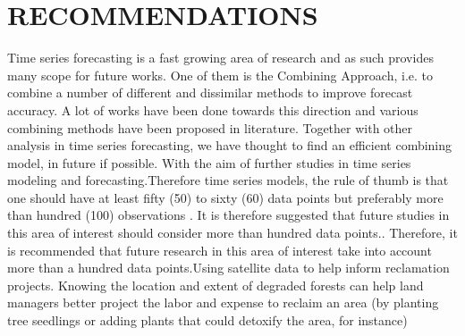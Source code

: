\section{RECOMMENDATIONS}
Time series forecasting is a fast growing area of research and as such provides many scope for future works. One of them is the Combining Approach, i.e. to combine a number of different and dissimilar methods to improve forecast accuracy. A lot of works have been done towards this direction and various combining methods have been proposed in literature. Together with other analysis in time series forecasting, we have thought to find an efficient combining model, in future if possible. With the aim of further studies in time series modeling and forecasting.Therefore time series models, the rule of thumb is that one should have at least fifty (50) to sixty (60) data points but preferably more than hundred (100) observations \parencite{box1975intervention}. It is therefore suggested that future studies in this area of interest should consider more than hundred data points.. Therefore, it is recommended that future research in this area of interest take into account more than a hundred data points.Using  satellite data to help inform reclamation projects. Knowing the location and extent of degraded forests can help land managers better project the labor and expense to reclaim an area (by planting tree seedlings or adding plants that could detoxify the area, for instance)